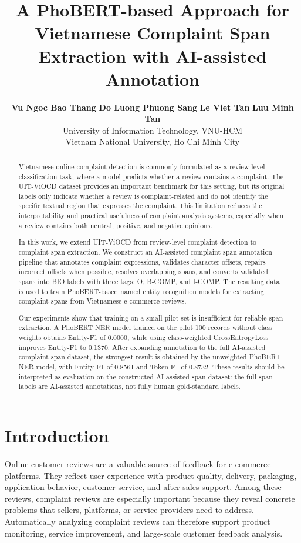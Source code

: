 \documentclass[11pt]{article}
\title{A PhoBERT-based Approach for Vietnamese Complaint Span Extraction with AI-assisted Annotation}
\author{
\begin{tabular}{c}
\textbf{Vu Ngoc Bao Thang} \quad
\textbf{Do Luong Phuong Sang} \quad
\textbf{Le Viet Tan} \quad
\textbf{Luu Minh Tan} \\
University of Information Technology, VNU-HCM \\
Vietnam National University, Ho Chi Minh City \\
\end{tabular}
}
\begin{document}
\maketitle

\begin{abstract}
Vietnamese online complaint detection is commonly formulated as a review-level classification task, where a model predicts whether a review contains a complaint. The UIT-ViOCD dataset provides an important benchmark for this setting, but its original labels only indicate whether a review is complaint-related and do not identify the specific textual region that expresses the complaint. This limitation reduces the interpretability and practical usefulness of complaint analysis systems, especially when a review contains both neutral, positive, and negative opinions.

In this work, we extend UIT-ViOCD from review-level complaint detection to complaint span extraction. We construct an AI-assisted complaint span annotation pipeline that annotates complaint expressions, validates character offsets, repairs incorrect offsets when possible, resolves overlapping spans, and converts validated spans into BIO labels with three tags: O, B-COMP, and I-COMP. The resulting data is used to train PhoBERT-based named entity recognition models for extracting complaint spans from Vietnamese e-commerce reviews.

Our experiments show that training on a small pilot set is insufficient for reliable span extraction. A PhoBERT NER model trained on the pilot 100 records without class weights obtains Entity-F1 of 0.0000, while using class-weighted CrossEntropyLoss improves Entity-F1 to 0.1370.
After expanding annotation to the full AI-assisted complaint span dataset, the strongest result is obtained by the unweighted PhoBERT NER model, with Entity-F1 of 0.8561 and Token-F1 of 0.8732. These results should be interpreted as evaluation on the constructed AI-assisted span dataset: the full span labels are AI-assisted annotations, not fully human gold-standard labels.
\end{abstract}

\section{Introduction}

Online customer reviews are a valuable source of feedback for e-commerce platforms. They reflect user experience with product quality, delivery, packaging, application behavior, customer service, and after-sales support. Among these reviews, complaint reviews are especially important because they reveal concrete problems that sellers, platforms, or service providers need to address. Automatically analyzing complaint reviews can therefore support product monitoring, service improvement, and large-scale customer feedback analysis.
\end{document}

